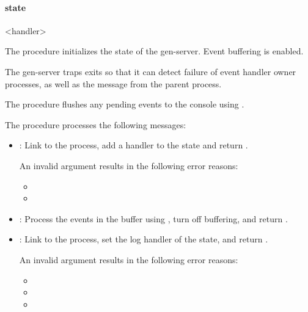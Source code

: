 \paragraph* {state}
\begin{record}\end{record}\antipar
\begin{argtbl}
\end{argtbl}

\begin{recorddef}{<handler>}
\end{recorddef}

The  procedure initializes the
state of the gen-server. Event buffering is enabled.

The gen-server traps exits so that it can detect failure of event
handler owner processes, as well as the  message from the
parent process.

The  procedure
flushes any pending events to the console using .

The  procedure
processes the following messages:

\antipar\begin{itemize}

\item {}: Link to the
   process, add a handler to the state and return
  .

  An invalid argument results in the following error reasons:
  \begin{itemize}
  \item {}
  \item {}
  \end{itemize}

\item {}: Process the events in the buffer using
  , turn off buffering, and return .

\item {}: Link to the
   process, set the log handler of the state, and return
  .

  An invalid argument results in the following error reasons:
  \begin{itemize}
  \item {}
  \item {}
  \item {}
  \end{itemize}

\end{itemize}

